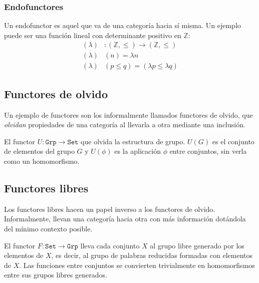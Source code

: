 \documentclass[11pt, fleqn, spanish]{book}
\begin{document}
    \subsubsection{Endofunctores}
      Un endofunctor es aquel que va de una categoría hacia sí misma. Un ejemplo
      puede ser una función lineal con determinante positivo en $\mathbb{Z}$:
      \begin{align*}
       (\lambda)&: \mathtt{(\mathbb{Z},\leq)} \rightarrow \mathtt{(\mathbb{Z},\leq)} \\
       (\lambda)&(n) = \lambda n \\
       (\lambda)&(p \leq q) = (\lambda p \leq \lambda q)
      \end{align*}

  
  \subsection {Functores de olvido}
    Un ejemplo de functores son los informalmente llamados functores de olvido,
    que \textit{olvidan} propiedades de una categoría al llevarla a otra mediante
    una inclusión.
    
    \begin{example} El functor $U: \mathtt{Grp} \rightarrow \mathtt{Set}$ que olvida la
    estructura de grupo. $U(G)$ es el conjunto de elementos del grupo $G$ y $U(\phi)$
    es la aplicación $\phi$ entre conjuntos, sin verla como un homomorfismo.
    \end{example}
    
  \subsection {Functores libres}
    Los functores libres hacen un papel inverso a los functores de olvido.
    Informalmente, llevan una categoría hacia otra con más información dotándola del mínimo
    contexto posible.
    
    \begin{example} El functor $F: \mathtt{Set} \rightarrow \mathtt{Grp}$ lleva cada conjunto $X$
    al grupo libre generado por los elementos de $X$, es decir, al grupo de palabras
    reducidas formadas con elementos de $X$. Las funciones entre conjuntos se convierten
    trivialmente en homomorfismos entre sus grupos libres generados.
    \end{example}
\end{document}
